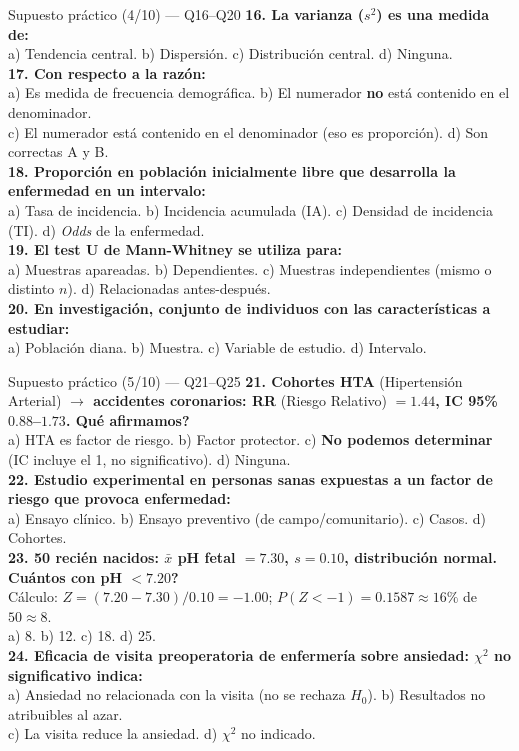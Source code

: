 \documentclass[aspectratio=169,8pt]{beamer}
\begin{document}
\begin{frame}{Supuesto pr\'actico (4/10) --- Q16--Q20}
  \scriptsize
  \textbf{16. La varianza ($s^2$) es una medida de:}\\
  a) Tendencia central.\; b) Dispersi\'on.\; c) Distribuci\'on central.\; d) Ninguna.\\[3pt]
  \textbf{17. Con respecto a la raz\'on:}\\
  a) Es medida de frecuencia demogr\'afica.\;
  b) El numerador \textbf{no} est\'a contenido en el denominador.\\
  c) El numerador est\'a contenido en el denominador (eso es proporci\'on).\; d) Son correctas A y B.\\[3pt]
  \textbf{18. Proporci\'on en poblaci\'on inicialmente libre que desarrolla la enfermedad en un intervalo:}\\
  a) Tasa de incidencia.\; b) Incidencia acumulada (IA).\;
  c) Densidad de incidencia (TI).\; d) \emph{Odds} de la enfermedad.\\[3pt]
  \textbf{19. El test U de Mann-Whitney se utiliza para:}\\
  a) Muestras apareadas.\; b) Dependientes.\; c) Muestras independientes (mismo o distinto $n$).\; d) Relacionadas antes-despu\'es.\\[3pt]
  \textbf{20. En investigaci\'on, \guillemotleft conjunto de individuos con las caracter\'isticas a estudiar\guillemotright:}\\
  a) Poblaci\'on diana.\; b) Muestra.\; c) Variable de estudio.\; d) Intervalo.
\end{frame}

\begin{frame}{Supuesto pr\'actico (5/10) --- Q21--Q25}
  \scriptsize
  \textbf{21. Cohortes HTA} (Hipertensi\'on Arterial) \textbf{$\to$ accidentes coronarios: RR} (Riesgo Relativo) \textbf{$=1.44$, IC 95\% $0.88$--$1.73$. \textquestiondown{}Qu\'e afirmamos?}\\
  a) HTA es factor de riesgo.\; b) Factor protector.\;
  c) \textbf{No podemos determinar} (IC incluye el 1, no significativo).\; d) Ninguna.\\[3pt]
  \textbf{22. Estudio experimental en personas sanas expuestas a un factor de riesgo que provoca enfermedad:}\\
  a) Ensayo cl\'inico.\; b) Ensayo preventivo (de campo/comunitario).\; c) Casos.\; d) Cohortes.\\[3pt]
  \textbf{23. 50 reci\'en nacidos: $\bar x$ pH fetal $=7.30$, $s=0.10$, distribuci\'on normal. \textquestiondown{}Cu\'antos con pH $<7.20$?}\\
  C\'alculo: $Z=(7.20-7.30)/0.10=-1.00$; $P(Z<-1)=0.1587\approx16\%$ de $50\approx8$.\\
  a) 8.\; b) 12.\; c) 18.\; d) 25.\\[3pt]
  \textbf{24. Eficacia de visita preoperatoria de enfermer\'ia sobre ansiedad: $\chi^2$ no significativo indica:}\\
  a) Ansiedad no relacionada con la visita (no se rechaza $H_0$).\; b) Resultados no atribuibles al azar.\\
  c) La visita reduce la ansiedad.\; d) $\chi^2$ no indicado.
\end{frame}
\end{document}
